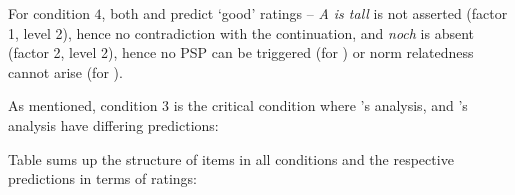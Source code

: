 \documentclass[output=paper,
modfonts
]{langscibook}
\begin{document}
For condition $4$, both \citeauthor{Hofstetter2013} and \citeauthor{umbach2009a_comp} predict `good' ratings -- \textit{A is tall} is not asserted (factor 1, level 2), hence no contradiction with the continuation, and \textit{noch} is absent (factor 2, level 2), hence no PSP can be triggered (for \citeauthor{Hofstetter2013}) or norm relatedness cannot arise (for \citeauthor{umbach2009a_comp}).

As mentioned, condition 3 is the critical condition where \citeauthor{Hofstetter2013}'s \citeyearpar{Hofstetter2013} analysis, and \citeauthor{umbach2009a_comp}'s \citeyearpar{umbach2009a_comp} analysis have differing predictions:

Table  sums up the structure of items in all conditions and the respective predictions in terms of ratings:
\end{document}
